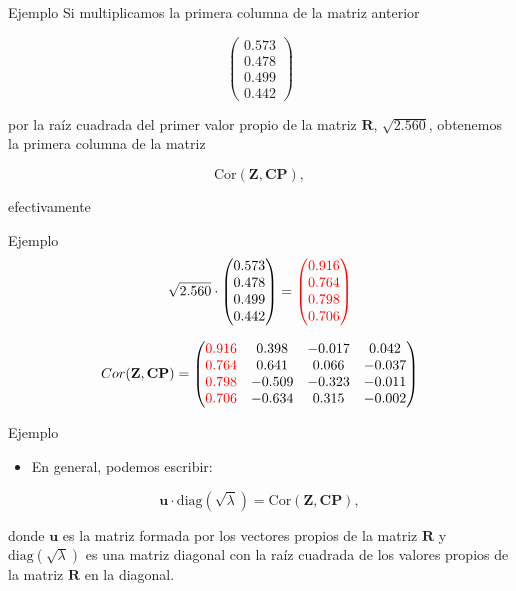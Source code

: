 \documentclass[
  ignorenonframetext,
]{beamer}
\providecommand{\tightlist}{%
  \setlength{\itemsep}{0pt}\setlength{\parskip}{0pt}}
\begin{document}
\begin{frame}{Ejemplo}
\protect\hypertarget{ejemplo-28}{}
Si multiplicamos la primera columna de la matriz anterior

\[\begin{pmatrix}0.573 \\ 0.478\\ 0.499 \\ 0.442\end{pmatrix}\]

por la raíz cuadrada del primer valor propio de la matriz
\(\mathbf{R}\), \(\sqrt{2.560}\), obtenemos la primera columna de la
matriz

\[\mbox{Cor}(\mathbf{Z},\mathbf{CP}),\]

efectivamente
\end{frame}

\begin{frame}{Ejemplo}
\protect\hypertarget{ejemplo-29}{}
\[
\sqrt{2.560}\cdot \begin{pmatrix}0.573 \\ 0.478\\ 0.499 \\ 0.442\end{pmatrix} =
\textcolor{red}{\begin{pmatrix}0.916 \\ 0.764\\ 0.798 \\ 0.706\end{pmatrix}}
\]

\[
Cor(\mathbf{Z},\mathbf{CP}) =
\begin{pmatrix}
\textcolor{red}{0.916} & 0.398 & -0.017 & 0.042 \\
\textcolor{red}{0.764} & 0.641 & 0.066 & -0.037 \\
\textcolor{red}{0.798} & -0.509 & -0.323 & -0.011 \\
\textcolor{red}{0.706} & -0.634 & 0.315 & -0.002 
\end{pmatrix}
\]
\end{frame}

\begin{frame}{Ejemplo}
\protect\hypertarget{ejemplo-30}{}
\begin{itemize}
\tightlist
\item
  En general, podemos escribir:
\end{itemize}

\[
\mathbf{u}\cdot \mbox{diag}(\sqrt{\lambda}) = \mbox{Cor}(\mathbf{Z},\mathbf{CP}),
\]

donde \(\mathbf{u}\) es la matriz formada por los vectores propios de la
matriz \(\mathbf{R}\) y \(\mbox{diag}(\sqrt{\lambda})\) es una matriz
diagonal con la raíz cuadrada de los valores propios de la matriz
\(\mathbf{R}\) en la diagonal.
\end{frame}
\end{document}

